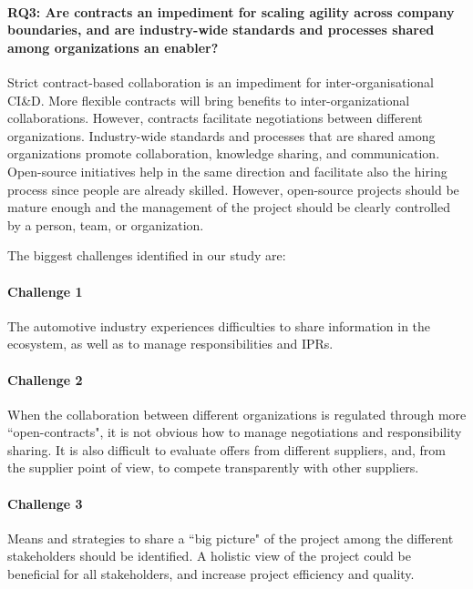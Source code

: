 \paragraph*{RQ3: Are contracts an impediment for scaling agility across company boundaries, and 
are industry-wide standards and processes shared among organizations an enabler?} %
Strict contract-based collaboration is an impediment for inter-organisational CI\&D. More flexible contracts will bring benefits to inter-organizational collaborations. However, contracts facilitate negotiations between different organizations. Industry-wide standards and processes that are shared among organizations promote collaboration, knowledge sharing, and communication. Open-source initiatives help in the same direction and facilitate also the hiring process since people are already skilled. However, open-source projects should be mature enough and the management of the project should be clearly controlled by a person, team, or organization.



The biggest challenges identified in our study are: 

\paragraph{Challenge 1} The automotive industry experiences difficulties to share information in the ecosystem, as well as to manage responsibilities and IPRs. 
\paragraph{Challenge 2} When the collaboration between different organizations is regulated through more ``open-contracts", it is not obvious  how to manage negotiations and responsibility sharing. It is also difficult to evaluate offers from different suppliers, and, from the supplier point of view, to compete transparently with other suppliers. 
\paragraph{Challenge 3} Means and strategies to share a ``big picture" of the project among the different stakeholders should be identified. A holistic view of the project could be beneficial for all stakeholders, and increase project efficiency and quality. 




